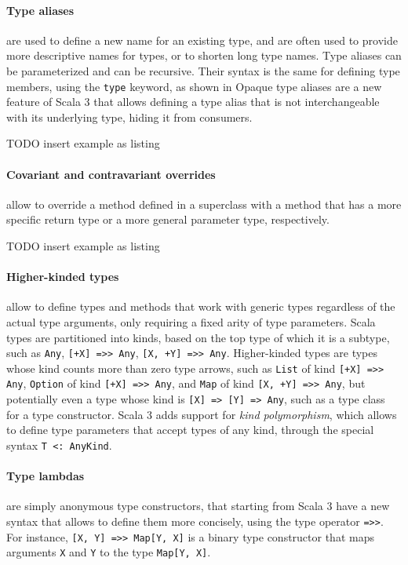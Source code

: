 \paragraph{Type aliases} are used to define a new name for an existing type, and are often used to provide more descriptive names for types, or to shorten long type names.
%
Type aliases can be parameterized and can be recursive.
%
Their syntax is the same for defining type members, using the \texttt{type} keyword, as shown in
%
Opaque type aliases are a new feature of Scala 3 that allows defining a type alias that is not interchangeable with its underlying type, hiding it from consumers.

TODO insert example as listing

\paragraph{Covariant and contravariant overrides} allow to override a method defined in a superclass with a method that has a more specific return type or a more general parameter type, respectively.

TODO insert example as listing

\paragraph{Higher-kinded types} allow to define types and methods that work with generic types regardless of the actual type arguments, only requiring a fixed arity of type parameters.
%
Scala types are partitioned into kinds, based on the top type of which it is a subtype, such as \texttt{Any}, \texttt{[+X] =>> Any}, \texttt{[X, +Y] =>> Any}.
%
Higher-kinded types are types whose kind counts more than zero type arrows, such as \texttt{List} of kind \texttt{[+X] =>> Any}, \texttt{Option} of kind \texttt{[+X] =>> Any}, and \texttt{Map} of kind \texttt{[X, +Y] =>> Any}, but potentially even a type whose kind is \texttt{[X] => [Y] => Any}, such as a type class for a type constructor.
%
Scala 3 adds support for \textit{kind polymorphism}, which allows to define type parameters that accept types of any kind, through the special syntax \texttt{T <: AnyKind}.

\paragraph{Type lambdas} are simply anonymous type constructors, that starting from Scala 3 have a new syntax that allows to define them more concisely, using the type operator \texttt{=>>}.
%
For instance, \texttt{[X, Y] =>> Map[Y, X]} is a binary type constructor that maps arguments \texttt{X} and \texttt{Y} to the type \texttt{Map[Y, X]}.

